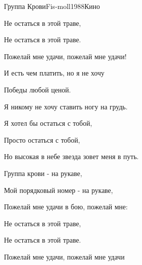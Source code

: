 \documentclass[a4paper,draft]{book}
\begin{document}
\begin{otherlanguage}{russian}
\begin{song}{Группа Крови}{Fis-moll}{1988}{Кино}{}{}
\begin{SBChorus}
	Не остаться в этой траве,

	Не остаться в этой траве.

	Пожелай мне удачи, пожелай мне удачи!
\end{SBChorus}

\begin{SBVerse}
	И есть чем платить, но я не хочу

	Победы любой ценой.

	Я никому не хочу ставить ногу на грудь.

	Я хотел бы остаться с тобой,

	Просто остаться с тобой,

	Но высокая в небе звезда зовет меня в путь.
\end{SBVerse}

\begin{SBChorus}
	Группа крови - на рукаве,

	Мой порядковый номер - на рукаве,

	Пожелай мне удачи в бою, пожелай мне:

	Не остаться в этой траве,

	Не остаться в этой траве.

	Пожелай мне удачи, пожелай мне удачи
\end{SBChorus}
\end{song}

\end{otherlanguage}
\end{document}
